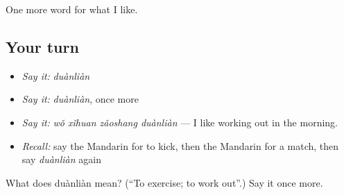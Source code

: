 \begin{grammarlens}[title={What you've built}]
One more word for what I like.
\end{grammarlens}

\subsection*{Your turn}
\begin{itemize}
\raggedright
  \item \emph{Say it:} \emph{duànliàn}
  \item \emph{Say it:} \emph{duànliàn}, once more
  \item \emph{Say it:} \emph{wǒ xǐhuan zǎoshang duànliàn} — I like working out in the morning.
  \item \emph{Recall:} say the Mandarin for to kick, then the Mandarin for a match, then say \emph{duànliàn} again
\end{itemize}

\begin{tcolorbox}[breakable,colback=teal!4,colframe=teal!35!black,title={Before you move on}]
What does duànliàn mean? (\textquotedblleft{}To exercise; to work out\textquotedblright{}.) Say it once more.
\end{tcolorbox}
